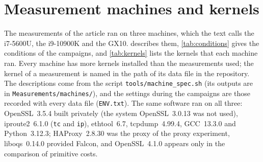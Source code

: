 \documentclass[preprint,12pt]{elsarticle}
\begin{document}
\begin{table}[!htbp]\centering\small
\caption{Effect of writing application messages as one write per TLS record on the model outputs (cold connections, main-sweep grid with $\pi=0$, CPU scale 1; \texttt{app\_records\_effect.py}). Flows: affected flows, of the 24 combinations of profile and chain depth of each suite. Rows $>0.5$\,ms: rows whose latency changes by more than 0.5\,ms, of the 2\,160 combinations of bit rate, RTT and MTU of each suite. Largest: largest absolute change. $\phi$ and $\phi$ with: share of rows with $O>T_\mathrm{cpu}$ (\cref{M-eq:share}) without and with the option. The RSA-2048, RSA-3072, ECDSA-P256, ECDSA-P256 + hybrid KEM and Falcon-512 suites have no affected flow.}
\label{tab:records}
\end{table}


\FloatBarrier
\section{Measurement machines and kernels}
\label{app:machines}
The measurements of the article ran on three machines, which the text calls the i7-5600U, the i9-10900K and the GX10.  describes them, \cref{tab:conditions} gives the conditions of the campaigns, and \cref{tab:kernels} lists the kernels that each machine ran. Every machine has more kernels installed than the measurements used; the kernel of a measurement is named in the path of its data file in the repository. The descriptions come from the script \texttt{tools/machine\_spec.sh} (its outputs are in \texttt{Measurements/machines/}), and the settings during the campaigns are those recorded with every data file (\texttt{ENV.txt}). The same software ran on all three: OpenSSL~3.5.4 built privately (the system OpenSSL~3.0.13 was not used), iproute2~6.1.0 (\texttt{tc} and \texttt{ip}), ethtool~6.7, tcpdump~4.99.4, GCC~13.3.0 and Python~3.12.3; HAProxy~2.8.30 was the proxy of the proxy experiment, liboqs~0.14.0 provided Falcon, and OpenSSL~4.1.0 appears only in the comparison of primitive costs.
\end{document}
